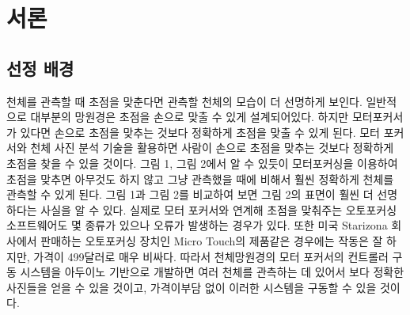 \documentclass{abstract_hutech}
\begin{document}
\thispagestyle{firstpage}

\section{서론}

\subsection{선정 배경}

천체를 관측할 때 초점을 맞춘다면 관측할 천체의 모습이 더 선명하게 보인다. 일반적으로 대부분의 망원경은 초점을 손으로 맞출 수 있게 설계되어있다. 하지만 모터포커서가 있다면 손으로 초점을 맞추는 것보다 정확하게 초점을 맞출 수 있게 된다. 모터 포커서와 천체 사진 분석 기술을 활용하면 사람이 손으로 초점을 맞추는 것보다 정확하게 초점을 찾을 수 있을 것이다. 그림 1, 그림 2에서 알 수 있듯이 모터포커싱을 이용하여 초점을 맞추면 아무것도 하지 않고 그냥 관측했을 때에 비해서 훨씬 정확하게 천체를 관측할 수 있게 된다. 그림 1과 그림 2를 비교하여 보면 그림 2의 표면이 훨씬 더 선명하다는 사실을 알 수 있다. 실제로 모터 포커서와 연계해 초점을 맞춰주는 오토포커싱 소프트웨어도 몇 종류가 있으나 오류가 발생하는 경우가 있다. 또한 미국 Starizona 회사에서 판매하는 오토포커싱 장치인 Micro Touch의 제품같은 경우에는 작동은 잘 하지만, 가격이 499달러로 매우 비싸다. 따라서 천체망원경의 모터 포커서의 컨트롤러 구동 시스템을 아두이노 기반으로 개발하면 여러 천체를 관측하는 데 있어서 보다 정확한 사진들을 얻을 수 있을 것이고, 가격이부담 없이 이러한 시스템을 구동할 수 있을 것이다.
\end{document}
